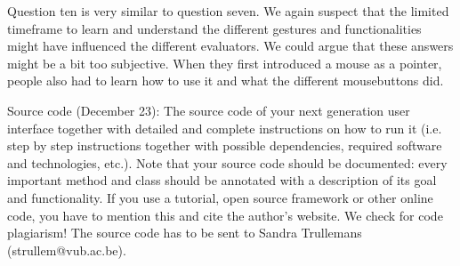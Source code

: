 \documentclass{article}
\begin{document}
Question ten is very similar to question seven. We again suspect that the limited timeframe to learn and understand the different gestures and functionalities might have influenced the different evaluators. We could argue that these answers might be a bit too subjective. When they first introduced a mouse as a pointer, people also had to learn how to use it and what the different mousebuttons did.

\newpage
Source code (December 23): The source code of your next generation user interface together with
detailed and complete instructions on how to run it (i.e. step by step instructions together with possible
dependencies, required software and technologies, etc.). Note that your source code should be
documented: every important method and class should be annotated with a description of its goal and
functionality. If you use a tutorial, open source framework or other online code, you have to mention
this and cite the author’s website. We check for code plagiarism! The source code has to be sent to
Sandra Trullemans (strullem@vub.ac.be).
\end{document}
